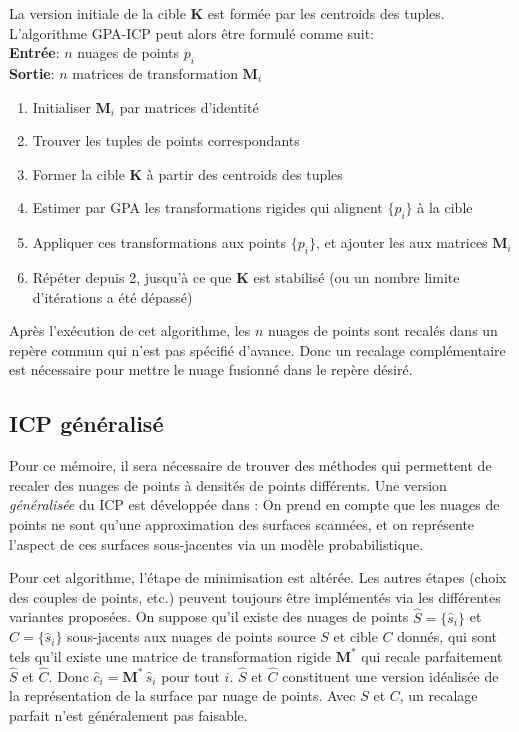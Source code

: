 \documentclass[a4paper,10pt]{scrreprt}
\begin{document}
La version initiale de la cible $\mathbf{K}$ est formée par les centroids des tuples. L'algorithme GPA-ICP peut alors être formulé comme suit: \cite{Told2010} \\
\textbf{Entrée}: $n$ nuages de points ${p_i}$ \\
\textbf{Sortie}: $n$ matrices de transformation ${\mathbf{M}_i}$
\begin{enumerate}
	\item Initialiser ${\mathbf{M}_i}$ par matrices d'identité
	\item Trouver les tuples de points correspondants
	\item Former la cible $\mathbf{K}$ à partir des centroids des tuples
	\item Estimer par GPA les transformations rigides qui alignent $\{p_i\}$ à la cible
	\item Appliquer ces transformations aux points $\{p_i\}$, et ajouter les aux matrices ${\mathbf{M}_i}$
	\item Répéter depuis 2, jusqu'à ce que $\mathbf{K}$ est stabilisé (ou un nombre limite d'itérations a été dépassé)
\end{enumerate} 
Après l'exécution de cet algorithme, les $n$ nuages de points sont recalés dans un repère commun qui n'est pas spécifié d'avance. Donc un recalage complémentaire est nécessaire pour mettre le nuage fusionné dans le repère désiré.

\subsection{ICP généralisé}
Pour ce mémoire, il sera nécessaire de trouver des méthodes qui permettent de recaler des nuages de points à densités de points différents. Une version \emph{généralisée} du ICP est développée dans \cite{Sega2009}: On prend en compte que les nuages de points ne sont qu'une approximation des surfaces scannées, et on représente l'aspect de ces surfaces sous-jacentes via un modèle probabilistique.

Pour cet algorithme, l'étape de minimisation est altérée. Les autres étapes (choix des couples de points, etc.) peuvent toujours être implémentés via les différentes variantes proposées. On suppose qu'il existe des nuages de points $\hat{S} = \{ \hat{s}_i \}$ et $\hat{C} = \{ \hat{s}_i \}$ sous-jacents aux nuages de points source $S$ et cible $C$ donnés, qui sont tels qu'il existe une matrice de transformation rigide $\mathbf{M}^*$ qui recale parfaitement $\hat{S}$ et $\hat{C}$. Donc $\hat{c}_i = \mathbf{M}^* \, \hat{s}_i$ pour tout $i$. $\hat{S}$ et $\hat{C}$ constituent une version idéalisée de la représentation de la surface par nuage de points. Avec $S$ et $C$, un recalage parfait n'est généralement pas faisable.
\end{document}

